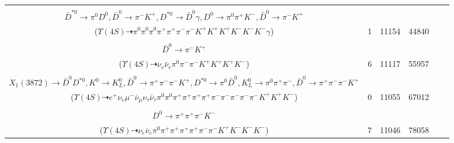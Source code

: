 \documentclass[landscape]{article}
\newcounter{rownumbers}
\newcommand\rn{\stepcounter{rownumbers}\arabic{rownumbers}}
\newcommand{\EOLP}{\\ \hline} %
\newcommand{\topoTags}[1]{#1} %
\begin{document}
\begin{longtable}{clcccc}
\rn & \makecell[l]{ $ 
\Upsilon(4S) \rightarrow B^{+} B^{-} ,
B^{+} \rightarrow K^{+} X_{1}(3872) ,
B^{-} \rightarrow K^{-} X_{1}(3872) ,
X_{1}(3872) \rightarrow D^{0} \bar{D}^{*0} ,
X_{1}(3872) \rightarrow \bar{D}^{0} D^{*0} ,
D^{0} \rightarrow \pi^{0} \pi^{+} K^{-} ,
$ \\ $
\bar{D}^{*0} \rightarrow \pi^{0} D^{0} ,
\bar{D}^{0} \rightarrow \pi^{-} K^{+} ,
D^{*0} \rightarrow \bar{D}^{0} \gamma ,
D^{0} \rightarrow \pi^{0} \pi^{+} K^{-} ,
\bar{D}^{0} \rightarrow \pi^{-} K^{+} 
$ \\ ($
\Upsilon(4S) \dashrightarrow \pi^{0} \pi^{0} \pi^{0} \pi^{+} \pi^{+} \pi^{-} \pi^{-} K^{+} K^{+} K^{+} K^{-} K^{-} K^{-} \gamma 
$) } & \topoTags{1 & }11154 & 44840 \EOLP

\rn & \makecell[l]{ $ 
\Upsilon(4S) \rightarrow B^{+} B^{-} ,
B^{+} \rightarrow \nu_{e} \bar{\nu}_{e} K^{+} ,
B^{-} \rightarrow K^{-} X_{1}(3872) ,
X_{1}(3872) \rightarrow \bar{D}^{0} D^{*0} ,
\bar{D}^{0} \rightarrow \pi^{-} K^{+} ,
D^{*0} \rightarrow \pi^{0} \bar{D}^{0} ,
$ \\ $
\bar{D}^{0} \rightarrow \pi^{-} K^{+} 
$ \\ ($
\Upsilon(4S) \dashrightarrow \nu_{e} \bar{\nu}_{e} \pi^{0} \pi^{-} \pi^{-} K^{+} K^{+} K^{+} K^{-} 
$) } & \topoTags{6 & }11117 & 55957 \EOLP

\rn & \makecell[l]{ $ 
\Upsilon(4S) \rightarrow B^{+} B^{-} ,
B^{+} \rightarrow \tau^{+} \tau^{-} X_{su} ,
B^{-} \rightarrow K^{-} X_{1}(3872) ,
\tau^{+} \rightarrow e^{+} \nu_{e} \bar{\nu}_{\tau} ,
\tau^{-} \rightarrow \mu^{-} \bar{\nu}_{\mu} \nu_{\tau} ,
X_{su} \rightarrow \pi^{+} K^{0} ,
$ \\ $
X_{1}(3872) \rightarrow \bar{D}^{0} D^{*0} ,
K^{0} \rightarrow K_{L}^{0} ,
\bar{D}^{0} \rightarrow \pi^{+} \pi^{-} \pi^{-} K^{+} ,
D^{*0} \rightarrow \pi^{0} \bar{D}^{0} ,
K_{L}^{0} \rightarrow \pi^{0} \pi^{+} \pi^{-} ,
\bar{D}^{0} \rightarrow \pi^{+} \pi^{-} \pi^{-} K^{+} 
$ \\ ($
\Upsilon(4S) \dashrightarrow e^{+} \nu_{e} \mu^{-} \bar{\nu}_{\mu} \nu_{\tau} \bar{\nu}_{\tau} \pi^{0} \pi^{0} \pi^{+} \pi^{+} \pi^{+} \pi^{+} \pi^{-} \pi^{-} \pi^{-} \pi^{-} \pi^{-} K^{+} K^{+} K^{-} 
$) } & \topoTags{0 & }11055 & 67012 \EOLP

\rn & \makecell[l]{ $ 
\Upsilon(4S) \rightarrow B^{+} B^{-} ,
B^{+} \rightarrow K^{+} X_{1}(3872) ,
B^{-} \rightarrow \nu_{e} \bar{\nu}_{e} K^{-} ,
X_{1}(3872) \rightarrow D^{0} \bar{D}^{*0} ,
D^{0} \rightarrow \pi^{+} \pi^{+} \pi^{-} K^{-} ,
\bar{D}^{*0} \rightarrow \pi^{0} D^{0} ,
$ \\ $
D^{0} \rightarrow \pi^{+} \pi^{+} \pi^{-} K^{-} 
$ \\ ($
\Upsilon(4S) \dashrightarrow \nu_{e} \bar{\nu}_{e} \pi^{0} \pi^{+} \pi^{+} \pi^{+} \pi^{+} \pi^{-} \pi^{-} K^{+} K^{-} K^{-} K^{-} 
$) } & \topoTags{7 & }11046 & 78058 \EOLP


\end{longtable}
\end{document}
